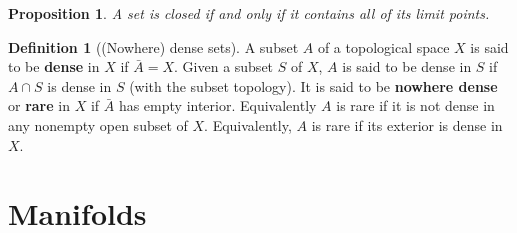 \documentclass[a4paper,12pt,parskip=half*,chapterprefix=true,numbers=noendperiod]{scrreprt}
\newtheorem{proposition}{Proposition}[section]
\theoremstyle{definition}
\newtheorem{definition}{Definition}[section]
\theoremstyle{remark}
\begin{document}
\begin{proposition}
A set is closed if and only if it contains all of its limit points.
\end{proposition}

\begin{definition}[(Nowhere) dense sets]
A subset $A$ of a topological space $X$ is said to be \textbf{dense} in $X$ if $\bar{A}=X$. Given a subset $S$ of $X$, $A$ is said to be dense in $S$ if $A\cap S$ is dense in $S$ (with the subset topology). It is said to be \textbf{nowhere dense} or \textbf{rare} in $X$ if $\bar{A}$ has empty interior. Equivalently $A$ is rare if it is not dense in any nonempty open subset of $X$. Equivalently, $A$ is rare if its exterior is dense in $X$. 
\end{definition}




\part{Manifolds}



\printbibliography
\end{document}
